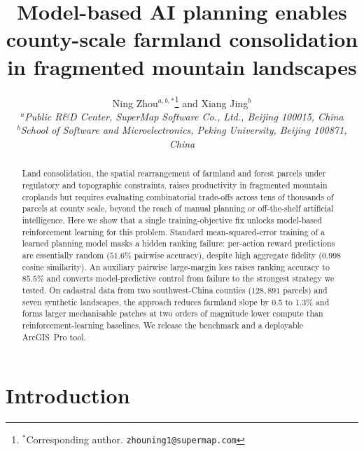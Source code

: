 \documentclass[11pt]{article}
\begin{document}
\title{Model-based AI planning enables county-scale farmland consolidation in fragmented mountain landscapes}

\author{Ning Zhou$^{a,b,\ast}$\thanks{$^\ast$Corresponding author. \texttt{zhouning1@supermap.com}} and Xiang Jing$^{b}$\\
$^{a}${\em Public R\&D Center, SuperMap Software Co., Ltd., Beijing 100015, China}\\
$^{b}${\em School of Software and Microelectronics, Peking University, Beijing 100871, China}}

\date{}
\maketitle
\sloppy  %

\begin{abstract}
Land consolidation, the spatial rearrangement of farmland and forest parcels under regulatory and topographic constraints, raises productivity in fragmented mountain croplands but requires evaluating combinatorial trade-offs across tens of thousands of parcels at county scale, beyond the reach of manual planning or off-the-shelf artificial intelligence. Here we show that a single training-objective fix unlocks model-based reinforcement learning for this problem. Standard mean-squared-error training of a learned planning model masks a hidden ranking failure: per-action reward predictions are essentially random ($51.6\%$ pairwise accuracy), despite high aggregate fidelity ($0.998$ cosine similarity). An auxiliary pairwise large-margin loss raises ranking accuracy to $85.5\%$ and converts model-predictive control from failure to the strongest strategy we tested. On cadastral data from two southwest-China counties ($128{,}891$ parcels) and seven synthetic landscapes, the approach reduces farmland slope by 0.5 to 1.3$\%$ and forms larger mechanisable patches at two orders of magnitude lower compute than reinforcement-learning baselines. We release the benchmark and a deployable ArcGIS~Pro tool.
\end{abstract}

\section{Introduction}\label{sec:intro}
\end{document}
